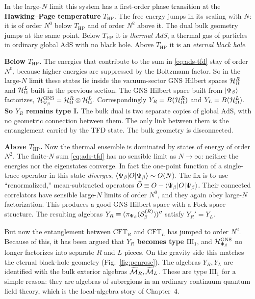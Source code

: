 In the large-$N$ limit this system has a first-order phase transition at the \textbf{Hawking--Page
temperature} $T_{\text{HP}}$. The free energy jumps in its scaling with $N$: it is of order $N^0$ below
$T_{\text{HP}}$ and of order $N^2$ above it. The dual bulk geometry jumps at the same point. Below
$T_{\text{HP}}$ it is \emph{thermal AdS}, a thermal gas of particles in ordinary global AdS with no black hole.
Above $T_{\text{HP}}$ it is an \emph{eternal black hole}.

\textbf{Below $T_{\text{HP}}$.} The energies that contribute to the sum in \eqref{eq:ads-tfd} stay of order
$N^0$, because higher energies are suppressed by the Boltzmann factor. So in the large-$N$ limit these states lie
inside the vacuum-sector GNS Hilbert spaces $\mathcal{H}_\Omega^R$ and $\mathcal{H}_\Omega^L$ built in the previous section. The
GNS Hilbert space built from $\ket{\Psi_\beta}$ factorizes, $\mathcal{H}_{\Psi_\beta}^{\text{GNS}}=
\mathcal{H}_\Omega^R\otimes\mathcal{H}_\Omega^L$. Correspondingly $Y_R=B(\mathcal{H}_\Omega^R)$ and $Y_L=B(\mathcal{H}_\Omega^L)$. \textbf{So
$Y_R$ remains type I.} The bulk dual is two separate copies of global AdS, with no geometric connection between
them. The only link between them is the entanglement carried by the TFD state. The bulk geometry is
disconnected.

\textbf{Above $T_{\text{HP}}$.} Now the thermal ensemble is dominated by states of energy of order $N^2$. The
finite-$N$ sum \eqref{eq:ads-tfd} has no sensible limit as $N\to\infty$: neither the energies nor the
eigenstates converge. In fact the one-point function of a single-trace operator in this state \emph{diverges},
$\braket{\Psi_\beta|O|\Psi_\beta}\sim O(N)$. The fix is to use ``renormalized,'' mean-subtracted operators
$\widehat O\equiv O-\braket{\Psi_\beta|O|\Psi_\beta}$. Their connected correlators have sensible large-$N$
limits of order $N^0$, and they again obey large-$N$ factorization. This produces a good GNS Hilbert space with
a Fock-space structure. The resulting algebras $Y_R\equiv(\pi_{\Psi_\beta}(\mathcal{S}_\beta^{(R)}))''$ satisfy
$Y_R'=Y_L$.

But now the entanglement between $\text{CFT}_R$ and $\text{CFT}_L$ has jumped to order $N^2$. Because of this,
it has been argued that \textbf{$Y_R$ becomes type $\mathrm{III}_1$}, and $\mathcal{H}_{\Psi_\beta}^{\text{GNS}}$ no
longer factorizes into separate $R$ and $L$ pieces. On the gravity side this matches the eternal black-hole
geometry (Fig.~\ref{fig:penrose}). The algebras $Y_R,Y_L$ are identified with the bulk exterior algebras
$\widetilde{\mathcal{M}}_R,\widetilde{\mathcal{M}}_L$. These are type $\mathrm{III}_1$ for a simple reason: they are algebras of
subregions in an ordinary continuum quantum field theory, which is the local-algebra story of Chapter~4.

